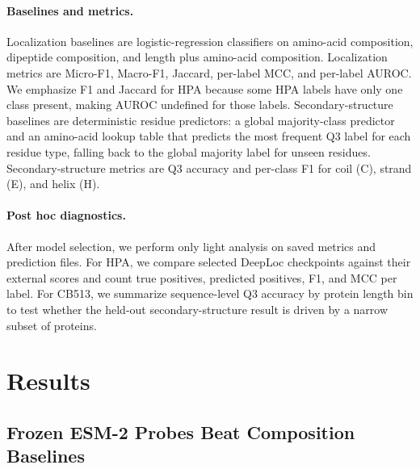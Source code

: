 \documentclass{article}
\begin{document}
\paragraph{Baselines and metrics.}
Localization baselines are logistic-regression classifiers on amino-acid composition, dipeptide composition, and length plus amino-acid composition. Localization metrics are Micro-F1, Macro-F1, Jaccard, per-label MCC, and per-label AUROC. We emphasize F1 and Jaccard for HPA because some HPA labels have only one class present, making AUROC undefined for those labels. Secondary-structure baselines are deterministic residue predictors: a global majority-class predictor and an amino-acid lookup table that predicts the most frequent Q3 label for each residue type, falling back to the global majority label for unseen residues. Secondary-structure metrics are Q3 accuracy and per-class F1 for coil (C), strand (E), and helix (H).

\paragraph{Post hoc diagnostics.}
After model selection, we perform only light analysis on saved metrics and prediction files. For HPA, we compare selected DeepLoc checkpoints against their external scores and count true positives, predicted positives, F1, and MCC per label. For CB513, we summarize sequence-level Q3 accuracy by protein length bin to test whether the held-out secondary-structure result is driven by a narrow subset of proteins.

\section{Results}

\subsection{Frozen ESM-2 Probes Beat Composition Baselines}
\end{document}
